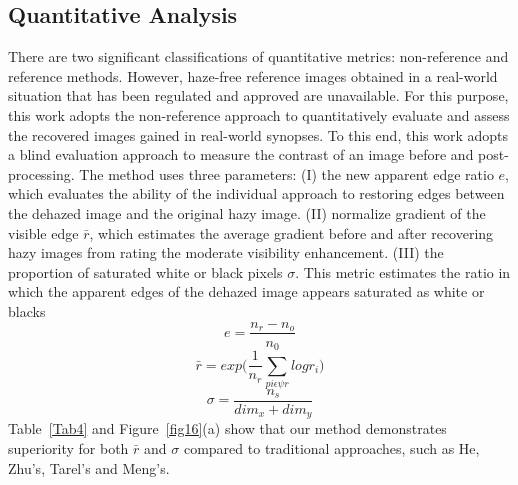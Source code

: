 \documentclass[doctor,english,listoffigures,listoftables]{thesis-uestc}
\begin{document}
\subsection{Quantitative Analysis}
There are two significant classifications of quantitative metrics: non-reference and reference methods. However, haze-free reference images obtained in a real-world situation that has been regulated and approved are unavailable. For this purpose, this work adopts the non-reference approach to quantitatively evaluate and assess the recovered images gained in real-world synopses.
To this end, this work adopts a blind evaluation approach to measure the contrast of an image before and post-processing. The method uses three parameters: (I) the new apparent edge ratio $e$, which evaluates the ability of the individual approach to restoring edges between the dehazed image and the original hazy image. (II) normalize gradient of the visible edge $\bar r$, which estimates the average gradient before and after recovering hazy images from rating the moderate visibility enhancement. (III) the proportion of saturated white or black pixels $\sigma$. This metric estimates the ratio in which the apparent edges of the dehazed image 
appears  saturated as white or blacks
\begin{equation}
e=\frac{n_r-n_o}{n_0}
\end{equation}
\begin{equation}
\bar r= exp\bigg(\frac{1}{n_r}\sum_{pi\epsilon\psi r} log r_i\bigg)
\end{equation}
\begin{equation}
\sigma=\frac{n_s}{dim_x +dim_y}
\end{equation} 
Table~\ref{Tab4} and Figure~\ref{fig16}(a) show that our method demonstrates superiority  for both $\bar r $ and $\sigma$ compared to traditional approaches, such as He, Zhu's, Tarel's and Meng's.
\end{document}
